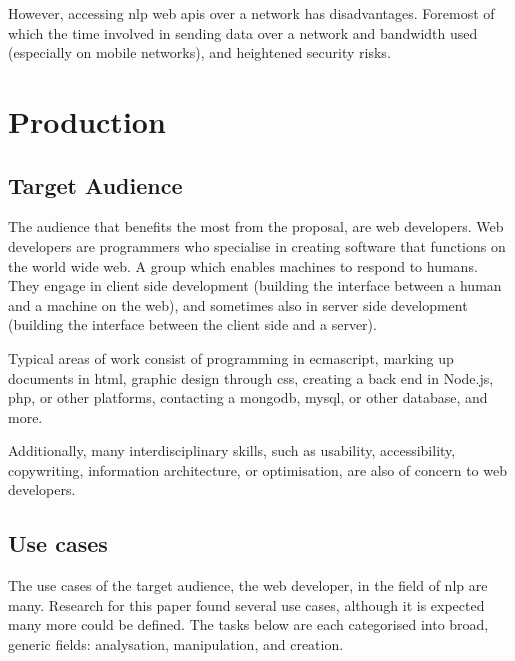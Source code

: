 However, accessing \gls{nlp} web \glspl{api} over a network has
  disadvantages.
Foremost of which the time involved in sending data over a network and
  bandwidth used (especially on mobile networks), and heightened security
  risks.

\chapter{Production}\label{production}

\section{Target Audience}\label{target-audience}

The audience that benefits the most from the proposal, are web developers.
Web developers are programmers who specialise in creating software that
  functions on the world wide web.
A group which enables machines to respond to humans.
They engage in client side development (building the interface between
  a human and a machine on the web), and sometimes also in server side
  development (building the interface between the client side and a
  server).

Typical areas of work consist of programming in \gls{ecmascript},
  marking up documents in \gls{html}, graphic design through \gls{css},
  creating a back end in Node.js, \gls{php}, or other platforms, contacting a
  \gls{mongodb}, \gls{mysql}, or other database, and more.

Additionally, many interdisciplinary skills, such as usability,
  accessibility, copywriting, information architecture, or optimisation,
  are also of concern to web developers.

\section{Use cases}\label{use-cases}

The use cases of the target audience, the web developer, in the field of
  \gls{nlp} are many.
Research for this paper found several use cases, although it is
  expected many more could be defined.
The tasks below are each categorised into broad, generic fields: analysation,
  manipulation, and creation.

